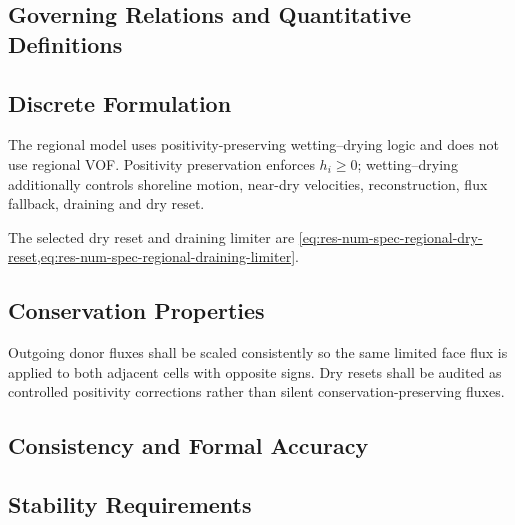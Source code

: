 \subsection{Governing Relations and Quantitative Definitions}
\label{sec:res-num-wet-governing-relations}

%

\subsection{Discrete Formulation}
\label{sec:res-num-wet-discrete-formulation}

The regional model uses positivity-preserving wetting--drying logic and
does not use regional VOF. Positivity preservation enforces
$h_i\ge 0$; wetting--drying additionally controls shoreline motion,
near-dry velocities, reconstruction, flux fallback, draining and dry
reset.

The selected dry reset and draining limiter are
\cref{eq:res-num-spec-regional-dry-reset,eq:res-num-spec-regional-draining-limiter}.

\subsection{Conservation Properties}
\label{sec:res-num-wet-conservation-properties}

Outgoing donor fluxes shall be scaled consistently so the same limited
face flux is applied to both adjacent cells with opposite signs. Dry
resets shall be audited as controlled positivity corrections rather than
silent conservation-preserving fluxes.

\subsection{Consistency and Formal Accuracy}
\label{sec:res-num-wet-consistency-formal-accuracy}


\subsection{Stability Requirements}
\label{sec:res-num-wet-stability-requirements}

